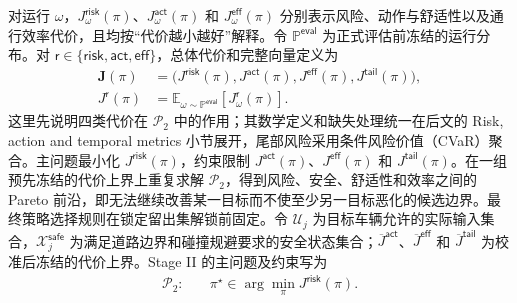 \documentclass[10pt,a4paper,twocolumn]{article}
\begin{document}
对运行 $\omega$，$J_\omega^{\mathsf{risk}}(\pi)$、$J_\omega^{\mathsf{act}}(\pi)$ 和 $J_\omega^{\mathsf{eff}}(\pi)$ 分别表示风险、动作与舒适性以及通行效率代价，且均按“代价越小越好”解释。令 $\mathbb P^{\mathsf{eval}}$ 为正式评估前冻结的运行分布。对 $\mathsf r\in\{\mathsf{risk},\mathsf{act},\mathsf{eff}\}$，总体代价和完整向量定义为
\begin{equation*}
\begin{aligned}
\mathbf J(\pi)&=\bigl(J^{\mathsf{risk}}(\pi),J^{\mathsf{act}}(\pi),
J^{\mathsf{eff}}(\pi),J^{\mathsf{tail}}(\pi)\bigr),\\
J^{\mathsf r}(\pi)&=\mathbb E_{\omega\sim\mathbb P^{\mathsf{eval}}}
\!\left[J_\omega^{\mathsf r}(\pi)\right].
\end{aligned}
\end{equation*}
这里先说明四类代价在 $\mathcal P_2$ 中的作用；其数学定义和缺失处理统一在后文的 Risk, action and temporal metrics 小节展开，尾部风险采用条件风险价值（CVaR）聚合。主问题最小化 $J^{\mathsf{risk}}(\pi)$，约束限制 $J^{\mathsf{act}}(\pi)$、$J^{\mathsf{eff}}(\pi)$ 和 $J^{\mathsf{tail}}(\pi)$。在一组预先冻结的代价上界上重复求解 $\mathcal P_2$，得到风险、安全、舒适性和效率之间的 Pareto 前沿，即无法继续改善某一目标而不使至少另一目标恶化的候选边界。最终策略选择规则在锁定留出集解锁前固定。令 $\mathcal U_j$ 为目标车辆允许的实际输入集合，$\mathcal X_j^{\mathsf{safe}}$ 为满足道路边界和碰撞规避要求的安全状态集合；$\overline J^{\mathsf{act}}$、$\overline J^{\mathsf{eff}}$ 和 $\overline J^{\mathsf{tail}}$ 为校准后冻结的代价上界。Stage II 的主问题及约束写为
\begin{equation}\label{eq:P2}
\begin{aligned}
\mathcal P_2:\quad
&\pi^\star\in\arg\min_{\pi}
J^{\mathsf{risk}}(\pi).
\end{aligned}
\end{equation}
\addtocounter{equation}{-1}
\allowdisplaybreaks[4]
\end{document}
